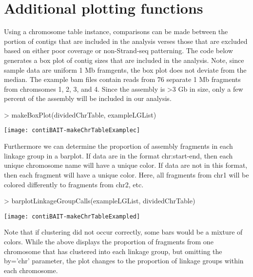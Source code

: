 \documentclass{article}
\begin{document}
\section{Additional plotting functions}

Using a chromosome table instance, comparisons can be made between the portion of contigs that are included in the analysis verses those that are excluded based on either poor coverage or non-Strand-seq patterning. The code below generates a box plot of contig sizes that are included in the analysis. Note, since sample data are uniform 1 Mb framgents, the box plot does not deviate from the median.  The example bam files contain reads from 76 separate 1 Mb fragments from chromsomes 1, 2, 3, and 4.  Since the assembly is >3 Gb in size, only a few percent of the assembly will be included in our analysis.

\begin{Schunk}
\begin{Sinput}
> makeBoxPlot(dividedChrTable, exampleLGList)
\end{Sinput}
\end{Schunk}
\texttt{[image: contiBAIT-makeChrTableExamplec]}

Furthermore we can determine the proportion of assembly fragments in each linkage group in a barplot. If data are in the format chr:start-end, then each unique chromosome name will have a unique color. If data are not in this format, then each fragment will have a unique color.  Here, all fragments from chr1 will be colored differently to fragments from chr2, etc.

\begin{Schunk}
\begin{Sinput}
> barplotLinkageGroupCalls(exampleLGList, dividedChrTable)
\end{Sinput}
\end{Schunk}
\texttt{[image: contiBAIT-makeChrTableExampled]}

Note that if clustering did not occur correctly, some bars would be a mixture of colors.  While the above displays the proportion of fragments from one chromosome that has clustered into each linkage group, but omitting the by='chr' parameter, the plot changes to the proportion of linkage groups within each chromosome.
\end{document}
